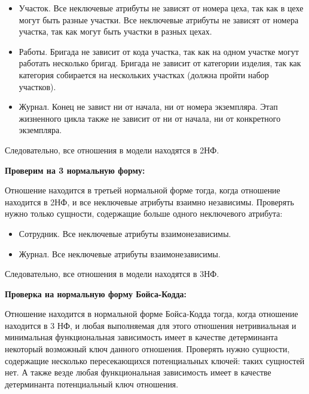 \begin{itemize}

    \item Участок.
    Все неключевые атрибуты не зависят от номера цеха, так как в цехе могут быть разные участки.
    Все неключевые атрибуты не зависят от номера участка, так как могут быть участки в разных цехах.

    \item Работы.
    Бригада не зависит от кода участка, так как на одном участке могут работать несколько бригад.
    Бригада не зависит от категории изделия, так как категория собирается на нескольких участках (должна пройти набор участков).

    \item Журнал.
    Конец не завист ни от начала, ни от номера экземпляра.
    Этап жизненного цикла также не зависит от ни от начала, ни от конкретного экземпляра.

\end{itemize}

Следовательно, все отношения в модели находятся в 2НФ.

{\bf Проверим на 3 нормальную форму:}

Отношение находится в третьей нормальной форме тогда, когда отношение находится в 2НФ, и все неключевые атрибуты взаимно независимы.
Проверять нужно только сущности, содержащие больше одного неключевого атрибута:

\begin{itemize}

    \item Сотрудник. Все неключевые атрибуты взаимонезависимы.
    \item Журнал. Все неключевые атрибуты взаимонезависимы.

\end{itemize}

Следовательно, все отношения в модели находятся в 3НФ.

{\bf Проверка на нормальную форму Бойса-Кодда:}

Отношение находится в нормальной форме Бойса-Кодда тогда, когда отношение находится в 3 НФ, и любая выполняемая для этого отношения нетривиальная и минимальная функциональная зависимость имеет в качестве детерминанта некоторый возможный ключ данного отношения.
Проверять нужно сущности, содержащие несколько пересекающихся потенциальных ключей: таких сущностей нет.
А также везде любая функциональная зависимость имеет в качестве детерминанта потенциальный ключ отношения.

